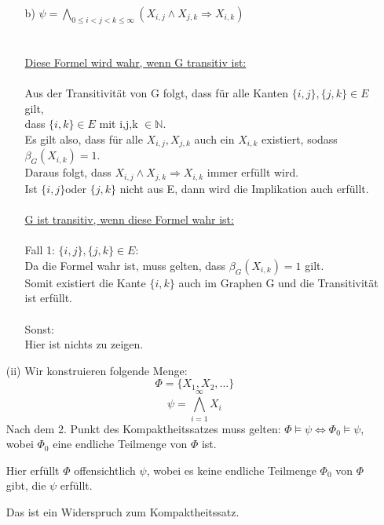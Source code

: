 \documentclass[a4paper,10pt]{article}
\begin{document}
\begin{enumerate}
\begin{enumerate}
		\item[b)]
		\( \psi = \bigwedge\limits_{0 \leq i < j < k \leq \infty}(X_{i,j} \wedge X_{j,k} \Rightarrow X_{i,k}) \)
		\\
		\\
		\\
		\underline{Diese Formel wird wahr, wenn G transitiv ist:}\\
		\\
		Aus der Transitivität von G folgt, dass für alle Kanten $\{i,j\}, \{j,k\} \in E$ gilt, \\
		dass $\{i,k\} \in E$ mit i,j,k $\in \mathbb{N}$. \\
		Es gilt also, dass für alle $X_{i,j}, X_{j,k}$ auch ein $X_{i,k}$ existiert, sodass $\beta_G (X_{i,k}) = 1$. \\
		Daraus folgt, dass $X_{i,j} \wedge X_{j,k} \Rightarrow X_{i,k}$ immer erfüllt wird. \\
		Ist $\{i,j\}$oder $\{j,k\}$ nicht aus E, dann wird die Implikation auch erfüllt.
		\\
		\\
		\underline{G ist transitiv, wenn diese Formel wahr ist:}\\
		\\
		Fall 1: $\{i,j\},\{j,k\} \in E$:
		\\
		Da die Formel wahr ist, muss gelten, dass $\beta_G(X_{i,k}) = 1$ gilt.\\
		Somit existiert die Kante $\{i,k\}$ auch im Graphen G und die Transitivität ist erfüllt.\\
		\\
		Sonst:
		\\
		Hier ist nichts zu zeigen.
		
		
		\end{enumerate}
	\item[(ii)]
	Wir konstruieren folgende Menge: 
	$$ \Phi = \{X_1,X_2,...\}$$
	$$\psi = \bigwedge_{i=1}^{\infty} X_i $$
	Nach dem 2. Punkt des Kompaktheitssatzes muss gelten: $\Phi \models \psi \Leftrightarrow \Phi_0 \models \psi$, wobei $\Phi_0$ eine endliche Teilmenge von $\Phi$ ist.

	Hier erfüllt $\Phi$ offensichtlich $\psi$, wobei es keine endliche Teilmenge $\Phi_0$ von $\Phi$ gibt, die $\psi$ erfüllt. 

	Das ist ein Widerspruch zum Kompaktheitssatz.
 
	\end{enumerate}
\end{document}
